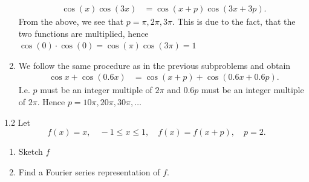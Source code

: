 \begin{derivation}
\begin{enumerate}[label=\alph*)]
\begin{align*}
        \cos (x) \cos (3x) &= \cos (x+p) \cos (3x + 3p)
      .\end{align*}
      From the above, we see that $p = \pi, 2\pi, 3\pi$.
      This is due to the fact, that the two functions are multiplied, hence $\cos(0) \cdot \cos (0) = \cos (\pi) \cos (3\pi) = 1$
    \item We follow the same procedure as in the previous subproblems and obtain
      \begin{align*}
        \cos x + \cos (\num{0,6} x) &= \cos (x+p) + \cos \left( \num{0,6} x + \num{0,6} p \right)
      .\end{align*}
      I.e. $p$ must be an integer multiple of $2\pi$ and $\num{0,6} p$ must be an integer multiple of $2\pi$.
      Hence $p = 10\pi, 20\pi, 30\pi,\ldots $
  \end{enumerate}
\end{derivation}



\begin{problem}{1.2}
  Let
  \begin{equation*}
    f(x) = x, \quad -1 \leq x \leq 1, \quad f(x) = f(x+p), \quad p=2
  .\end{equation*}
  \begin{enumerate}[label=\alph*)]
    \item Sketch $f$
    \item Find a Fourier series representation of $f$.
  \end{enumerate}
\end{problem}

